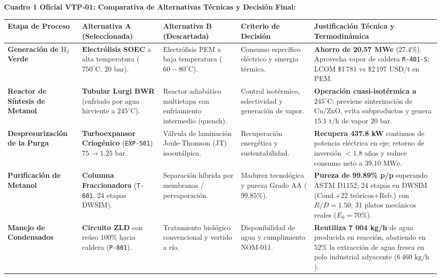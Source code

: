 \documentclass[10pt,landscape]{article}
\begin{document}
\vspace{2.5pt}

\noindent\textbf{\fontsize{8.2pt}{9.5pt}\selectfont \color{navyblue}Cuadro 1 Oficial VTP-01: Comparativa de Alternativas Técnicas y Decisión Final:}\par\vspace{1pt}

\scriptsize
\renewcommand{\arraystretch}{1.20}
\begin{tabularx}{\textwidth}{p{2.6cm} p{3.2cm} p{3.2cm} p{3.4cm} X}
  \toprule
  \rowcolor{tableheader}
  \textbf{\color{white}Etapa de Proceso} & \textbf{\color{white}Alternativa A (Seleccionada)} & \textbf{\color{white}Alternativa B (Descartada)} & \textbf{\color{white}Criterio de Decisión} & \textbf{\color{white}Justificación Técnica y Termodinámica} \\
  \midrule
  \rowcolor{roweven}
  \textbf{Generación de $\text{H}_2$ Verde} & 
  \textbf{Electrólisis SOEC} a alta temperatura ($750^\circ\text{C}$, $20\text{ bar}$). & 
  Electrólisis PEM a baja temperatura ($60-80^\circ\text{C}$). & 
  Consumo específico eléctrico y sinergia térmica. & 
  \textbf{Ahorro de 20.57 MWe} ($27.4\%$). Aprovecha vapor de caldera \texttt{R-401-S}; LCOM \$1\,781 vs \$2\,197 USD/t en PEM. \\
  \rowcolor{rowodd}
  \textbf{Reactor de Síntesis de Metanol} & 
  \textbf{Tubular Lurgi BWR} (enfriado por agua hirviente a $245^\circ\text{C}$). & 
  Reactor adiabático multietapa con enfriamiento intermedio (quench). & 
  Control isotérmico, selectividad y generación de vapor. & 
  \textbf{Operación cuasi-isotérmica a $245^\circ\text{C}$}; previene sinterización de $\text{Cu/ZnO}$, evita subproductos y genera $15.1\text{ t/h}$ de vapor $20\text{ bar}$. \\
  \rowcolor{roweven}
  \textbf{Despresurización de la Purga} & 
  \textbf{Turboexpansor Criogénico} (\texttt{EXP-501}) $75 \to 1.25\text{ bar}$. & 
  Válvula de laminación Joule-Thomson (JT) isoentálpica. & 
  Recuperación energética y sustentabilidad. & 
  \textbf{Recupera 437.8 kW} continuos de potencia eléctrica en eje; retorno de inversión $< 1.8$ años y reduce consumo neto a $39.10\text{ MWe}$. \\
  \rowcolor{rowodd}
  \textbf{Purificación de Metanol} & 
  \textbf{Columna Fraccionadora} (\texttt{T-601}, 24 etapas DWSIM). & 
  Separación híbrida por membranas / pervaporación. & 
  Madurez tecnológica y pureza Grado AA ($99.85\%$). & 
  \textbf{Pureza de 99.89\% p/p} superando ASTM D1152; 24 etapas en DWSIM (Cond.+22 teóricos+Reb.) con $R/D=1.50$; 31 platos mecánicos reales ($E_0=70\%$). \\
  \rowcolor{roweven}
  \textbf{Manejo de Condensados} & 
  \textbf{Circuito ZLD} con reúso $100\%$ hacia caldera (\texttt{P-801}). & 
  Tratamiento biológico convencional y vertido a río. & 
  Disponibilidad de agua y cumplimiento NOM-011. & 
  \textbf{Reutiliza 7 004 kg/h} de agua producida en reacción, abatiendo en $52\%$ la extracción de agua fresca en polo industrial adyacente ($6\,460\text{ kg/h}$). \\
  \bottomrule
\end{tabularx}
\end{document}
